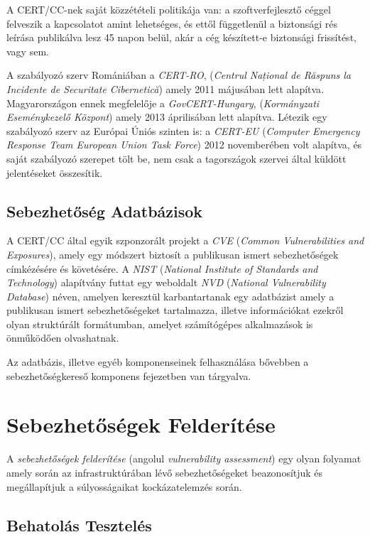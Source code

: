 \documentclass[a4paper,12pt]{article}
\begin{document}
	A CERT/CC-nek saját közzétételi politikája van: a szoftverfejlesztő céggel felveszik a kapcsolatot amint lehetséges, és ettől függetlenül a biztonsági rés leírása publikálva lesz 45 napon belül, akár a cég készített-e biztonsági frissítést, vagy sem.
	
	A szabályozó szerv Romániában a \textit{CERT-RO}, (\textit{Centrul Național de Răspuns la Incidente de Securitate Cibernetică}) amely 2011 májusában lett alapítva\cite{certro12}. Magyarországon ennek megfelelője a \textit{GovCERT-Hungary}, (\textit{Kormányzati Eseménykezelő Központ}) amely 2013 áprilisában lett alapítva\cite{certhu13}. Létezik egy szabályozó szerv az Európai Úniós szinten is: a \textit{CERT-EU} (\textit{Computer Emergency Response Team European Union Task Force}) 2012 novemberében volt alapítva\cite{certeu13}, és saját szabályozó szerepet tölt be, nem csak a tagországok szervei által küldött jelentéseket összesítik.
	
\subsection{Sebezhetőség Adatbázisok}
	
	A CERT/CC által egyik szponzorált projekt a \textit{CVE} (\textit{Common Vulnerabilities and Exposures}), amely egy módszert biztosít a publikusan ismert sebezhetőségek címkézésére és követésére. A \textit{NIST} (\textit{National Institute of Standards and Technology}) alapítvány futtat egy weboldalt \textit{NVD} (\textit{National Vulnerability Database}) néven, amelyen keresztül karbantartanak egy adatbázist amely a publikusan ismert sebezhetőségeket tartalmazza, illetve információkat ezekről olyan struktúrált formátumban, amelyet számítógépes alkalmazások is önműködően olvashatnak\cite{nvd15}.
	
	Az adatbázis, illetve egyéb komponenseinek felhasználása bővebben a sebezhetőségkereső komponens fejezetben van tárgyalva.
	
\section{Sebezhetőségek Felderítése}
	
	A \textit{sebezhetőségek felderítése} (angolul \textit{vulnerability assessment}) egy olyan folyamat amely során az infrastruktúrában lévő sebezhetőségeket beazonosítjuk és megállapítjuk a súlyosságaikat kockázatelemzés során.
	
\subsection{Behatolás Tesztelés}
	
\end{document}
